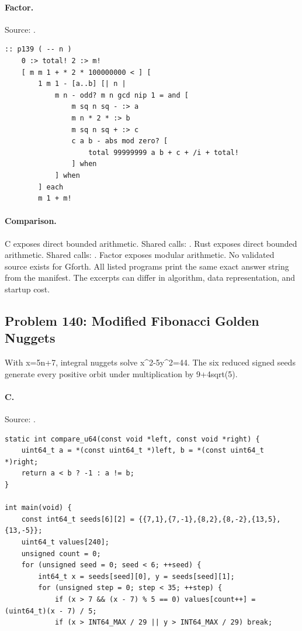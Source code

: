 \paragraph{Factor.} Source: .
\begin{lstlisting}
:: p139 ( -- n )
    0 :> total! 2 :> m!
    [ m m 1 + * 2 * 100000000 < ] [
        1 m 1 - [a..b] [| n |
            m n - odd? m n gcd nip 1 = and [
                m sq n sq - :> a
                m n * 2 * :> b
                m sq n sq + :> c
                c a b - abs mod zero? [
                    total 99999999 a b + c + /i + total!
                ] when
            ] when
        ] each
        m 1 + m!
\end{lstlisting}

\paragraph{Comparison.}
C exposes direct bounded arithmetic. Shared calls: \texttt{}. Rust exposes direct bounded arithmetic. Shared calls: \texttt{}. Factor exposes modular arithmetic.
No validated source exists for Gforth.
All listed programs print the same exact answer string from the manifest. The excerpts can differ in algorithm, data representation, and startup cost.

\subsection{Problem 140: Modified Fibonacci Golden Nuggets}
\label{walkthrough:p140}
With x=5n+7, integral nuggets solve x\textasciicircum{}2-5y\textasciicircum{}2=44. The six reduced signed seeds generate every positive orbit under multiplication by 9+4sqrt(5).

\paragraph{C.} Source: .
\begin{lstlisting}
static int compare_u64(const void *left, const void *right) {
    uint64_t a = *(const uint64_t *)left, b = *(const uint64_t *)right;
    return a < b ? -1 : a != b;
}

int main(void) {
    const int64_t seeds[6][2] = {{7,1},{7,-1},{8,2},{8,-2},{13,5},{13,-5}};
    uint64_t values[240];
    unsigned count = 0;
    for (unsigned seed = 0; seed < 6; ++seed) {
        int64_t x = seeds[seed][0], y = seeds[seed][1];
        for (unsigned step = 0; step < 35; ++step) {
            if (x > 7 && (x - 7) % 5 == 0) values[count++] = (uint64_t)(x - 7) / 5;
            if (x > INT64_MAX / 29 || y > INT64_MAX / 29) break;
\end{lstlisting}

